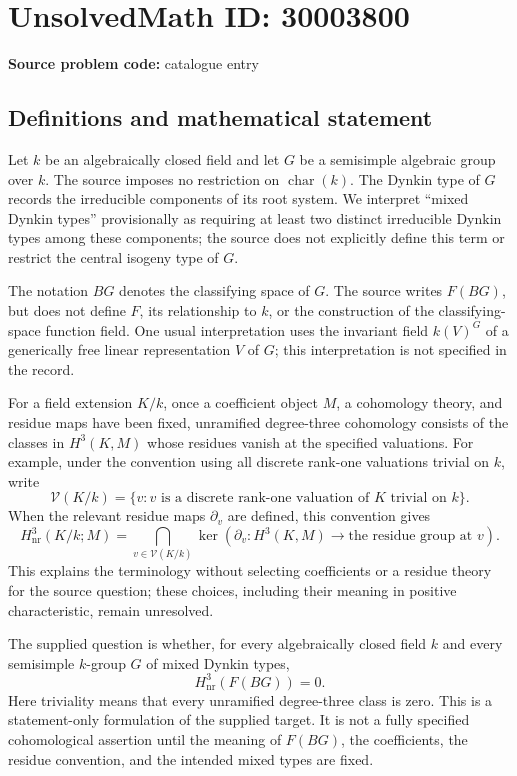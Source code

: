 \documentclass[11pt]{article}
\begin{document}
\section*{UnsolvedMath ID: 30003800}
\textbf{Source problem code:} catalogue entry
\subsection{Definitions and mathematical statement}
Let \(k\) be an algebraically closed field and let \(G\) be a semisimple algebraic group over \(k\). The source imposes no restriction on \(\operatorname{char}(k)\). The Dynkin type of \(G\) records the irreducible components of its root system. We interpret ``mixed Dynkin types'' provisionally as requiring at least two distinct irreducible Dynkin types among these components; the source does not explicitly define this term or restrict the central isogeny type of \(G\).

The notation \(BG\) denotes the classifying space of \(G\). The source writes \(F(BG)\), but does not define \(F\), its relationship to \(k\), or the construction of the classifying-space function field. One usual interpretation uses the invariant field \(k(V)^G\) of a generically free linear representation \(V\) of \(G\); this interpretation is not specified in the record.

For a field extension \(K/k\), once a coefficient object \(M\), a cohomology theory, and residue maps have been fixed, unramified degree-three cohomology consists of the classes in \(H^3(K,M)\) whose residues vanish at the specified valuations. For example, under the convention using all discrete rank-one valuations trivial on \(k\), write
\[
\mathcal V(K/k)=\{v: v\text{ is a discrete rank-one valuation of }K\text{ trivial on }k\}.
\]
When the relevant residue maps \(\partial_v\) are defined, this convention gives
\[
H^3_{\mathrm{nr}}(K/k;M)
=\bigcap_{v\in\mathcal V(K/k)}\ker\!\left(\partial_v:H^3(K,M)\longrightarrow\text{the residue group at }v\right).
\]
This explains the terminology without selecting coefficients or a residue theory for the source question; these choices, including their meaning in positive characteristic, remain unresolved.

The supplied question is whether, for every algebraically closed field \(k\) and every semisimple \(k\)-group \(G\) of mixed Dynkin types,
\[
H_{\mathrm{nr}}^3(F(BG))=0.
\]
Here triviality means that every unramified degree-three class is zero. This is a statement-only formulation of the supplied target. It is not a fully specified cohomological assertion until the meaning of \(F(BG)\), the coefficients, the residue convention, and the intended mixed types are fixed.
\end{document}
